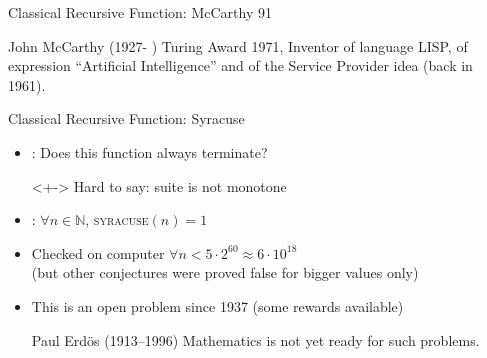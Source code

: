 \begin{Coupe}
\begin{frame}{Classical Recursive Function: McCarthy 91}
\begin{block}
\begin{itemize}
    \end{itemize}
    
  \end{block}

  \begin{block}{John McCarthy (1927- )}
    Turing Award 1971, Inventor of language LISP, of expression ``Artificial
    Intelligence'' and of the Service Provider idea (back in 1961).
  \end{block}
\end{frame}
\begin{frame}{Classical Recursive Function: Syracuse} \label{syracuse}

  \centerline{}

  \bigskip

  \begin{itemize}
  \item {}: Does this function always terminate?
  \item[]<+-> Hard to say: suite is not monotone
  \item<+-> :
    $\forall n\in\mathbb{N}$, \textsc{syracuse}$(n)=1$
  \item<+-> Checked on computer $\forall n<5\cdot2^{60}\approx6\cdot10^{18}$\\
    {\small(but other conjectures were proved false for bigger values only)}
  \item<+-> This is an open problem since 1937 (some rewards available)
    \begin{boitequote}{Paul Erd\"{o}s (1913--1996)}
      Mathematics is not yet ready for such problems.
    \end{boitequote}
  \end{itemize}

\end{frame}

\end{Coupe}

